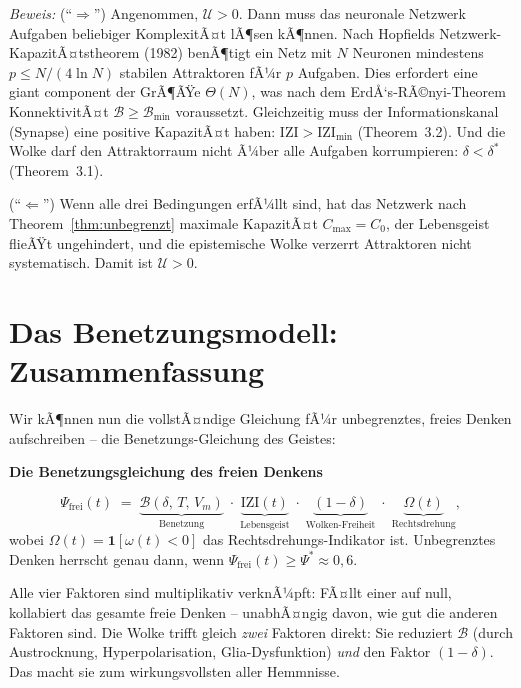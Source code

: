 ﻿\documentclass[12pt,a4paper]{report}
\theoremstyle{plain}
\theoremstyle{definition}
\theoremstyle{remark}
\begin{document}
	\textit{Beweis:}
	(``$\Rightarrow$'') Angenommen, $\mathcal{U} > 0$.
	Dann muss das neuronale Netzwerk Aufgaben beliebiger KomplexitÃ¤t lÃ¶sen
	kÃ¶nnen. Nach Hopfields Netzwerk-KapazitÃ¤tstheorem (1982) benÃ¶tigt
	ein Netz mit $N$ Neuronen mindestens $p \leq N/(4\ln N)$ stabilen
	Attraktoren fÃ¼r $p$ Aufgaben. Dies erfordert eine giant component der
	GrÃ¶ÃŸe $\Theta(N)$, was nach dem ErdÅ‘s-RÃ©nyi-Theorem KonnektivitÃ¤t
	$\mathcal{B} \geq \mathcal{B}_{\min}$ voraussetzt.
	Gleichzeitig muss der Informationskanal (Synapse) eine positive
	KapazitÃ¤t haben: $\mathrm{IZI} > \mathrm{IZI}_{\min}$ (Theorem~3.2).
	Und die Wolke darf den Attraktorraum nicht Ã¼ber alle Aufgaben
	korrumpieren: $\delta < \delta^*$ (Theorem~3.1).

	(``$\Leftarrow$'') Wenn alle drei Bedingungen erfÃ¼llt sind,
	hat das Netzwerk nach Theorem~\ref{thm:unbegrenzt} maximale
	KapazitÃ¤t $C_{\max} = C_0$, der Lebensgeist flieÃŸt ungehindert, und
	die epistemische Wolke verzerrt Attraktoren nicht systematisch.
	Damit ist $\mathcal{U} > 0$.
	\hfill

	\section{Das Benetzungsmodell: Zusammenfassung}

	Wir kÃ¶nnen nun die vollstÃ¤ndige Gleichung fÃ¼r unbegrenztes,
	freies Denken aufschreiben -- die Benetzungs-Gleichung des Geistes:

	
	\noindent\textbf{Die Benetzungsgleichung des freien Denkens}

		\[
		\Psi_{\mathrm{frei}}(t)
		\;=\;
		\underbrace{\mathcal{B}(\delta,\,T,\,V_m)}_{\text{Benetzung}}
		\;\cdot\;
		\underbrace{\mathrm{IZI}(t)}_{\text{Lebensgeist}}
		\;\cdot\;
		\underbrace{(1-\delta)}_{\text{Wolken-Freiheit}}
		\;\cdot\;
		\underbrace{\Omega(t)}_{\text{Rechtsdrehung}},
		\]
		wobei $\Omega(t) = \mathbf{1}[\omega(t) < 0]$
		das Rechtsdrehungs-Indikator ist.
		Unbegrenztes Denken herrscht genau dann, wenn
		$\Psi_{\mathrm{frei}}(t) \geq \Psi^* \approx 0{,}6$.


	Alle vier Faktoren sind multiplikativ verknÃ¼pft:
	FÃ¤llt einer auf null, kollabiert das gesamte freie Denken --
	unabhÃ¤ngig davon, wie gut die anderen Faktoren sind.
	Die Wolke trifft gleich \emph{zwei} Faktoren direkt:
	Sie reduziert $\mathcal{B}$ (durch Austrocknung, Hyperpolarisation,
	Glia-Dysfunktion) \emph{und} den Faktor $(1-\delta)$.
	Das macht sie zum wirkungsvollsten aller Hemmnisse.
\end{document}

